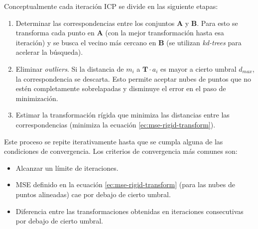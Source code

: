 Conceptualmente cada iteración ICP se divide en las siguiente etapas:
\begin{enumerate}

\item Determinar las correspondencias entre los conjuntos \textbf{A} y \textbf{B}. Para esto se transforma cada punto en \textbf{A} (con la mejor transformación hasta esa iteración) y se busca el vecino más cercano en \textbf{B} (se utilizan \textit{kd-trees} \cite{wiki-kdtree} para acelerar la búsqueda).

\item Eliminar \textit{outliers}. Si la distancia de $m_{i}$ a $\textbf{T} \cdot a_{i}$ es mayor a cierto umbral $d_{max}$, la correspondencia se descarta. Esto permite aceptar nubes de puntos que no estén completamente sobrelapadas y disminuye el error en el paso de minimización.

\item Estimar la transformación rígida que minimiza las distancias entre las correspondencias (minimiza la ecuación \ref{ec:mse-rigid-transform}).

\end{enumerate}

Este proceso se repite iterativamente hasta que se cumpla alguna de las condiciones de convergencia. Los criterios de convergencia más comunes son:
\begin{itemize}
\item Alcanzar un límite de iteraciones.

\item MSE definido en la ecuación \ref{ec:mse-rigid-transform} (para las nubes de puntos alineadas) cae por debajo de cierto umbral.

\item Diferencia entre las transformaciones obtenidas en iteraciones consecutivas por debajo de cierto umbral.
\end{itemize}

